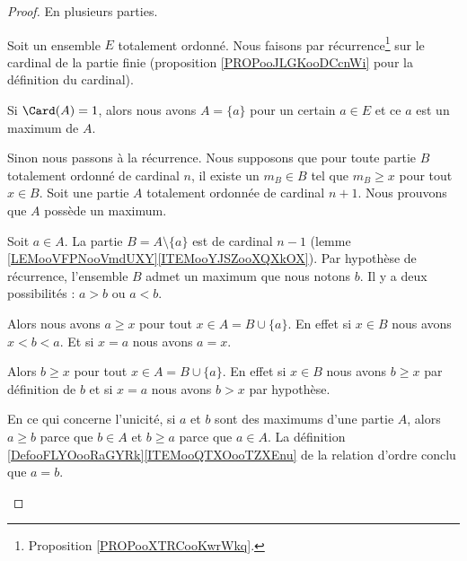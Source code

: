 \begin{proof}
	En plusieurs parties.
	\begin{subproof}
		Soit un ensemble \( E\) totalement ordonné. Nous faisons par récurrence\footnote{Proposition \ref{PROPooXTRCooKwrWkq}.} sur le cardinal de la partie finie (proposition \ref{PROPooJLGKooDCcnWi} pour la définition du cardinal).

		Si \( \Card(A)=1\), alors nous avons \( A=\{ a \}\) pour un certain \( a\in E\) et ce \( a\) est un maximum de \( A\).

		Sinon nous passons à la récurrence. Nous supposons que pour toute partie \( B\) totalement ordonné de cardinal \( n\), il existe un \( m_B\in B\) tel que \( m_B\geq x\) pour tout \( x\in B\). Soit une partie \( A\) totalement ordonnée de cardinal \( n+1\). Nous prouvons que \( A\) possède un maximum.

		Soit \( a\in A\). La partie \( B=A\setminus\{ a \}\) est de cardinal \( n-1\) (lemme \ref{LEMooVFPNooVmdUXY}\ref{ITEMooYJSZooXQXkOX}). Par hypothèse de récurrence, l'ensemble \( B\) admet un maximum que nous notons \( b\). Il y a deux possibilités : \( a>b\) ou \( a<b\).

		\begin{subproof}
			\spitem[Si \( a>b\)]
			Alors nous avons \( a\geq x\) pour tout \( x\in A=B\cup\{ a \}\). En effet si \( x\in B\) nous avons \( x<b<a\). Et si \( x=a\) nous avons \( a=x\).

			\spitem[Si \( b>a\)]
			Alors \( b\geq x\) pour tout \( x\in A=B\cup\{ a \}\). En effet si \( x\in B\) nous avons \( b\geq x\) par définition de \( b\) et si \( x=a\) nous avons \( b>x\) par hypothèse.
		\end{subproof}

		En ce qui concerne l'unicité, si \( a\) et \( b\) sont des maximums d'une partie \( A\), alors \( a\geq b\) parce que \( b\in A\) et \( b\geq a\) parce que \( a\in A\). La définition \ref{DefooFLYOooRaGYRk}\ref{ITEMooQTXOooTZXEnu} de la relation d'ordre conclu que \( a=b\).
	\end{subproof}
\end{proof}

